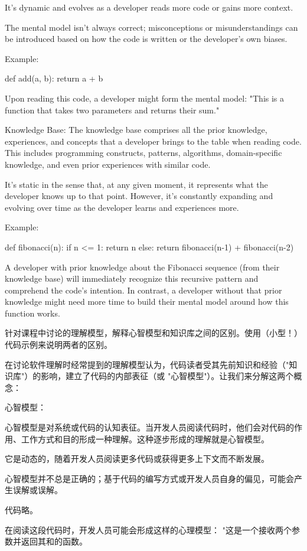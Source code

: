 \documentclass[]{ctexbook}
\begin{document}
It's dynamic and evolves as a developer reads more code or gains more context.

The mental model isn't always correct; misconceptions or misunderstandings can be introduced based on how the code is written or the developer's own biases.

Example:

def add(a, b):
return a + b

Upon reading this code, a developer might form the mental model: "This is a function that takes two parameters and returns their sum."

Knowledge Base:
The knowledge base comprises all the prior knowledge, experiences, and concepts that a developer brings to the table when reading code. This includes programming constructs, patterns, algorithms, domain-specific knowledge, and even prior experiences with similar code.

It's static in the sense that, at any given moment, it represents what the developer knows up to that point. However, it's constantly expanding and evolving over time as the developer learns and experiences more.

Example:

def fibonacci(n):
if n <= 1:
return n
else:
return fibonacci(n-1) + fibonacci(n-2)

A developer with prior knowledge about the Fibonacci sequence (from their knowledge base) will immediately recognize this recursive pattern and comprehend the code's intention. In contrast, a developer without that prior knowledge might need more time to build their mental model around how this function works.

针对课程中讨论的理解模型，解释心智模型和知识库之间的区别。使用（小型！）代码示例来说明两者的区别。

在讨论软件理解时经常提到的理解模型认为，代码读者受其先前知识和经验（"知识库"）的影响，建立了代码的内部表征（或 "心智模型"）。让我们来分解这两个概念：

心智模型：

心智模型是对系统或代码的认知表征。当开发人员阅读代码时，他们会对代码的作用、工作方式和目的形成一种理解。这种逐步形成的理解就是心智模型。

它是动态的，随着开发人员阅读更多代码或获得更多上下文而不断发展。

心智模型并不总是正确的；基于代码的编写方式或开发人员自身的偏见，可能会产生误解或误解。

代码略。

在阅读这段代码时，开发人员可能会形成这样的心理模型： "这是一个接收两个参数并返回其和的函数。
\end{document}
